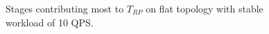 \begin{figure}
    \caption{Stages contributing most to {$T_{RP}$} on flat topology with stable workload of 10 QPS.}
    \label{fig:qr_brkdown}
\end{figure}